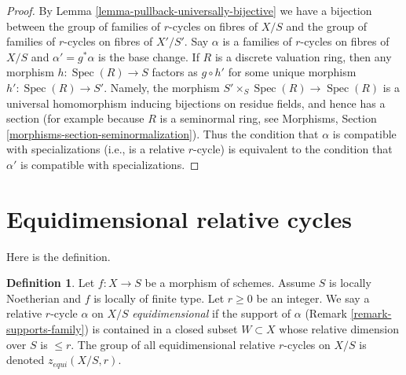 \documentclass{stacks-project}
\theoremstyle{plain}
\theoremstyle{definition}
\newtheorem{definition}[subsection]{Definition}
\theoremstyle{remark}
\numberwithin{equation}{subsection}
\def\Spec{\mathop{\mathrm{Spec}}}
\begin{document}
\begin{proof}
By Lemma \ref{lemma-pullback-universally-bijective} we have a bijection
between the group of families of $r$-cycles on fibres of $X/S$ and
the group of families of $r$-cycles on fibres of $X'/S'$.
Say $\alpha$ is a families of $r$-cycles on fibres of $X/S$ and
$\alpha' = g^*\alpha$ is the base change.
If $R$ is a discrete valuation ring, then any morphism
$h : \Spec(R) \to S$ factors as $g \circ h'$ for some
unique morphism $h' : \Spec(R) \to S'$.
Namely, the morphism $S' \times_S \Spec(R) \to \Spec(R)$ is
a universal homomorphism inducing bijections on residue fields,
and hence has a section (for example because $R$ is a seminormal
ring, see Morphisms, Section \ref{morphisms-section-seminormalization}).
Thus the condition that $\alpha$ is compatible with
specializations (i.e., is a relative $r$-cycle)
is equivalent to the condition that
$\alpha'$ is compatible with specializations.
\end{proof}






\section{Equidimensional relative cycles}
\label{section-equidimensional}

\noindent
Here is the definition.

\begin{definition}
\label{definition-equidimensional}
Let $f : X \to S$ be a morphism of schemes. Assume $S$ is locally Noetherian
and $f$ is locally of finite type. Let $r \geq 0$ be an integer. We say a
relative $r$-cycle $\alpha$ on $X/S$ {\it equidimensional} if the support
of $\alpha$ (Remark \ref{remark-supports-family})
is contained in a closed subset $W \subset X$ whose relative
dimension over $S$ is $\leq r$.
The group of all equidimensional relative $r$-cycles on $X/S$ is
denoted $z_{equi}(X/S, r)$.
\end{definition}
\end{document}
